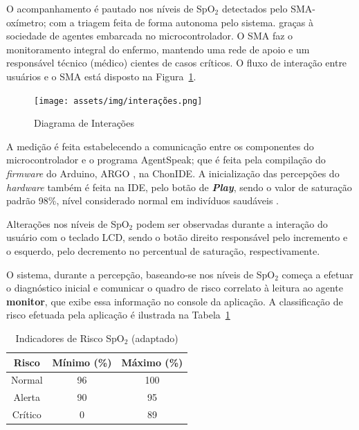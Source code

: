 O acompanhamento é pautado nos níveis de SpO$_2$ detectados pelo SMA-oxímetro; com a triagem feita de forma autonoma pelo sistema. graças à sociedade de agentes embarcada no microcontrolador. 
O SMA faz o monitoramento integral do enfermo, mantendo uma rede de apoio e um responsável técnico (médico) cientes de casos críticos. 
O fluxo de interação entre usuários e o SMA está disposto na Figura~\ref{fig:fig1}.

\begin{figure}[H]
  \centering
  \texttt{[image: assets/img/interações.png]}
  \caption{Diagrama de Interações}
  \label{fig:fig1}
\end{figure}

A medição é feita estabelecendo a comunicação entre os componentes do microcontrolador e o programa AgentSpeak; que é feita pela compilação do \textit{firmware} do Arduino, ARGO \cite{ArgoAgent}, na ChonIDE. A inicialização das percepções do \textit{hardware} também é feita na IDE, pelo botão de \textbf{\textit{Play}}, sendo o valor de saturação padrão 98\%, nível considerado normal em indivíduos saudáveis \cite{collins2015relating}.

Alterações nos níveis de SpO$_2$ podem ser observadas durante a interação do usuário com o teclado LCD, sendo o botão direito responsável pelo incremento e o esquerdo, pelo decremento no percentual de saturação, respectivamente.

O sistema, durante a percepção, baseando-se nos níveis de SpO$_2$ começa a efetuar o diagnóstico inicial e comunicar o quadro de risco correlato à leitura ao agente \textbf{monitor}, que exibe essa informação no console da aplicação. A classificação de risco efetuada pela aplicação é ilustrada na  Tabela~\ref{tab:tabela1}


\begin{table}[ht]
    \centering
    \begin{tabular}{|c|c|c|}
        \hline
        \textbf{Risco} & \textbf{Mínimo (\%)} & \textbf{Máximo (\%)} \\
        \hline
        Normal & 96 & 100 \\ 
        \hline
        Alerta & 90 & 95 \\ 
        \hline
        Crítico & 0 & 89 \\ 
        \hline
    \end{tabular}
    \caption{Indicadores de Risco SpO$_2$ (adaptado)\cite {kadarinaMonitoringHeartRate2018}}
    \label{tab:tabela1}
\end{table}

